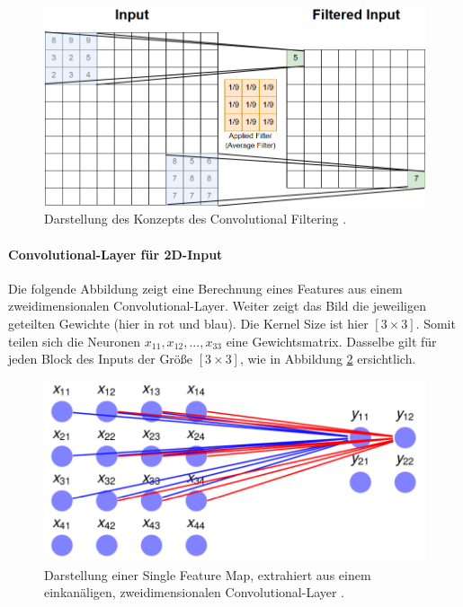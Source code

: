 \begin{figure}[htb!]
 \centering
 \includegraphics[scale=0.36]{abb/maucher_ConvolutionConcept}
 \caption[Beschreibung]{Darstellung des Konzepts des Convolutional Filtering \cite{maucher_nb_cnn}. }
\label{fig:maucher_cnn}
\end{figure}

\paragraph{Convolutional-Layer für 2D-Input}\label{anh_conv2d}
Die folgende Abbildung zeigt eine Berechnung eines Features aus einem zweidimensionalen Convolutional-Layer. Weiter zeigt das Bild die jeweiligen geteilten Gewichte (hier in rot und blau). Die Kernel Size ist hier $[3 \times 3]$. Somit teilen sich die Neuronen $x_{11}, x_{12}, ..., x_{33}$ eine Gewichtsmatrix. Dasselbe gilt für jeden Block des Inputs der Größe $[3 \times 3]$, wie in Abbildung \ref{fig:maucher_cnn2d} ersichtlich. 

\begin{figure}[htb!]
 \centering
 \includegraphics[scale=0.4]{abb/maucher_2dConvLayer}
 \caption[Beschreibung]{Darstellung einer Single Feature Map, extrahiert aus einem einkanäligen, zweidimensionalen Convolutional-Layer \cite{maucher_nb_cnn}. }
\label{fig:maucher_cnn2d}
\end{figure}


